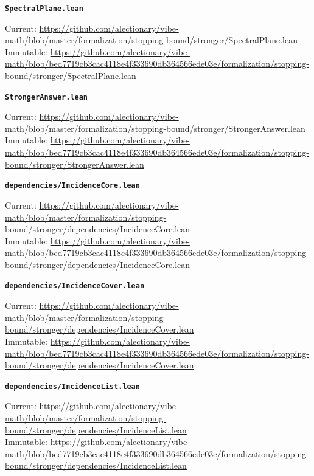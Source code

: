 \smallskip
\medskip
\par\noindent\textbf{\texttt{SpectralPlane.lean}}\par\nopagebreak
{\footnotesize\noindent Current: \url{https://github.com/alectionary/vibe-math/blob/master/formalization/stopping-bound/stronger/SpectralPlane.lean}\\
Immutable: \url{https://github.com/alectionary/vibe-math/blob/bed7719cb3cac4118e4f333690db364566ede03e/formalization/stopping-bound/stronger/SpectralPlane.lean}\par}
\smallskip
\medskip
\par\noindent\textbf{\texttt{StrongerAnswer.lean}}\par\nopagebreak
{\footnotesize\noindent Current: \url{https://github.com/alectionary/vibe-math/blob/master/formalization/stopping-bound/stronger/StrongerAnswer.lean}\\
Immutable: \url{https://github.com/alectionary/vibe-math/blob/bed7719cb3cac4118e4f333690db364566ede03e/formalization/stopping-bound/stronger/StrongerAnswer.lean}\par}
\smallskip
\medskip
\par\noindent\textbf{\texttt{dependencies/IncidenceCore.lean}}\par\nopagebreak
{\footnotesize\noindent Current: \url{https://github.com/alectionary/vibe-math/blob/master/formalization/stopping-bound/stronger/dependencies/IncidenceCore.lean}\\
Immutable: \url{https://github.com/alectionary/vibe-math/blob/bed7719cb3cac4118e4f333690db364566ede03e/formalization/stopping-bound/stronger/dependencies/IncidenceCore.lean}\par}
\smallskip
\medskip
\par\noindent\textbf{\texttt{dependencies/IncidenceCover.lean}}\par\nopagebreak
{\footnotesize\noindent Current: \url{https://github.com/alectionary/vibe-math/blob/master/formalization/stopping-bound/stronger/dependencies/IncidenceCover.lean}\\
Immutable: \url{https://github.com/alectionary/vibe-math/blob/bed7719cb3cac4118e4f333690db364566ede03e/formalization/stopping-bound/stronger/dependencies/IncidenceCover.lean}\par}
\smallskip
\medskip
\par\noindent\textbf{\texttt{dependencies/IncidenceList.lean}}\par\nopagebreak
{\footnotesize\noindent Current: \url{https://github.com/alectionary/vibe-math/blob/master/formalization/stopping-bound/stronger/dependencies/IncidenceList.lean}\\
Immutable: \url{https://github.com/alectionary/vibe-math/blob/bed7719cb3cac4118e4f333690db364566ede03e/formalization/stopping-bound/stronger/dependencies/IncidenceList.lean}\par}
